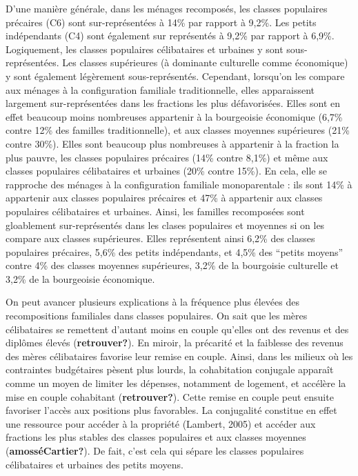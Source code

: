 \documentclass[
  12pt,
]{book}
\begin{document}
D'une manière générale, dans les ménages recomposés, les classes
populaires précaires (C6) sont sur-représentées à 14\% par rapport à
9,2\%. Les petits indépendants (C4) sont également sur représentés à
9,2\% par rapport à 6,9\%. Logiquement, les classes populaires
célibataires et urbaines y sont sous-représentées. Les classes
supérieures (à dominante culturelle comme économique) y sont également
légèrement sous-représentés. Cependant, lorsqu'on les compare aux
ménages à la configuration familiale traditionnelle, elles apparaissent
largement sur-représentées dans les fractions les plus défavorisées.
Elles sont en effet beaucoup moins nombreuses appartenir à la
bourgeoisie économique (6,7\% contre 12\% des familles traditionnelle),
et aux classes moyennes supérieures (21\% contre 30\%). Elles sont
beaucoup plus nombreuses à appartenir à la fraction la plus pauvre, les
classes populaires précaires (14\% contre 8,1\%) et même aux classes
populaires célibataires et urbaines (20\% contre 15\%). En cela, elle se
rapproche des ménages à la configuration familiale monoparentale : ils
sont 14\% à appartenir aux classes populaires précaires et 47\% à
appartenir aux classes populaires célibataires et urbaines. Ainsi, les
familles recomposées sont gloablement sur-représentés dans les clases
populaires et moyennes si on les compare aux classes supérieures. Elles
représentent ainsi 6,2\% des classes populaires précaires, 5,6\% des
petits indépendants, et 4,5\% des ``petits moyens'' contre 4\% des
classes moyennes supérieures, 3,2\% de la bourgoisie culturelle et 3,2\%
de la bourgeoisie économique.

On peut avancer plusieurs explications à la fréquence plus élevées des
recompositions familiales dans classes populaires. On sait que les mères
célibataires se remettent d'autant moins en couple qu'elles ont des
revenus et des diplômes élevés (\textbf{retrouver?}). En miroir, la
précarité et la faiblesse des revenus des mères célibataires favorise
leur remise en couple. Ainsi, dans les milieux où les contraintes
budgétaires pèsent plus lourds, la cohabitation conjugale apparaît comme
un moyen de limiter les dépenses, notamment de logement, et accélère la
mise en couple cohabitant (\textbf{retrouver?}). Cette remise en couple
peut ensuite favoriser l'accès aux positions plus favorables. La
conjugalité constitue en effet une ressource pour accéder à la propriété
(Lambert, 2005) et accéder aux fractions les plus stables des classes
populaires et aux classes moyennes (\textbf{amosséCartier?}). De fait,
c'est cela qui sépare les classes populaires célibataires et urbaines
des petits moyens.
\end{document}
